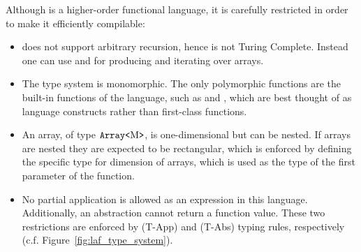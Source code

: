 Although \lafsharp{} is a higher-order functional language, it is carefully restricted in order to make it efficiently compilable:
\begin{itemize}
\item \lafsharp{} does not support arbitrary recursion, hence is not Turing Complete.
Instead one can use \vbuildk{} and \viteratek{} for producing and iterating over arrays.
\item The type system is monomorphic. The only polymorphic functions are the built-in functions of the language, such as \vbuildk{} and \viteratek{}, which are best thought of as language constructs rather than first-class functions.
\item An array, of type $\text{\texttt{Array<\textnormal{M}>}}$, is one-dimensional but can be nested. If arrays
are nested they are expected to be rectangular, which is enforced by defining the specific \typecard{} type for dimension of arrays, which is used as the type of the first parameter of the \vbuildk{} function.
\item No partial application is allowed as an expression in this language. 
Additionally, an abstraction cannot return a function value. These two restrictions are enforced by (T-App) and (T-Abs) typing rules, respectively (c.f. Figure~\ref{fig:laf_type_system}). 
\end{itemize}



